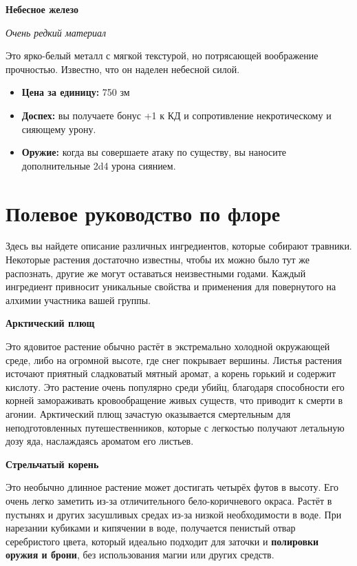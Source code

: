 \documentclass[a4paper, 9pt, twocolumn]{book}
\begin{document}
	\noindent \textbf{Небесное железо}
	
	\noindent \textit{Очень редкий материал}
	
	\smallskip
	
	\noindent Это ярко-белый металл с мягкой текстурой, но потрясающей воображение прочностью. Известно, что он наделен небесной силой.
	
	\begin{itemize}
		\item \textbf{Цена за единицу:} 750 зм
		
		\item \textbf{Доспех:} вы получаете бонус +1 к КД и сопротивление некротическому и сияющему урону. %
		
		\item \textbf{Оружие:} когда вы совершаете атаку по существу, вы наносите дополнительные 2d4 урона сиянием.
	\end{itemize}

	\chapter{Полевое руководство по флоре}
	
	Здесь вы найдете описание различных ингредиентов, которые собирают травники. Некоторые растения достаточно известны, чтобы их можно было тут же распознать, другие же могут оставаться неизвестными годами. Каждый ингредиент привносит уникальные свойства и применения для повернутого на алхимии участника вашей группы.
	
	\bigskip
	
	\noindent \textbf{Арктический плющ}
	
	\smallskip
	
	\noindent  Это ядовитое растение обычно растёт в экстремально холодной окружающей среде, либо на огромной высоте, где снег покрывает вершины. Листья растения источают приятный сладковатый мятный аромат, а корень горький и содержит кислоту. Это растение очень популярно среди убийц, благодаря способности его корней замораживать кровообращение живых существ, что приводит к смерти в агонии. Арктический плющ зачастую оказывается смертельным для неподготовленных путешественников, которые с легкостью получают летальную дозу яда, наслаждаясь ароматом его листьев.
	
	\medspace
	
	\noindent \textbf{Стрельчатый корень}
	
	\smallskip
	
	\noindent Это необычно длинное растение может достигать четырёх футов в высоту. Его очень легко заметить из-за отличительного бело-коричневого окраса. Растёт в пустынях и других засушливых средах из-за низкой необходимости в воде. При нарезании кубиками и кипячении в воде, получается пенистый отвар серебристого цвета, который идеально подходит для заточки и \textbf{полировки оружия и брони}, без использования магии или других средств.
	
\end{document}
